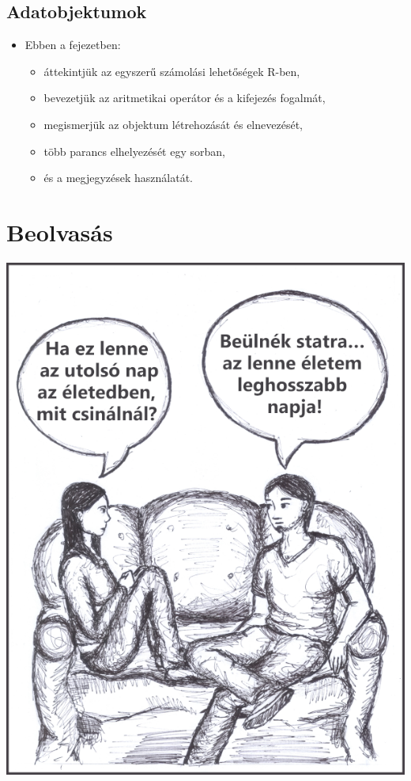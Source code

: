 \documentclass[
]{book}
\providecommand{\tightlist}{%
  \setlength{\itemsep}{0pt}\setlength{\parskip}{0pt}}
\newenvironment{rmdblock}[1]
  {\begin{shaded*}
  \begin{itemize}
  \renewcommand{\labelitemi}{
    \raisebox{-.7\height}[0pt][0pt]{
      {\setkeys{Gin}{width=3em,keepaspectratio}\texttt{[image: images/\#1]}}
    }
  }
  \item
  }
  {
  \end{itemize}
  \end{shaded*}
  }
\newenvironment{rmdlevel1}
  {\begin{rmdblock}{level1}}
  {\end{rmdblock}}
\begin{document}
\hypertarget{adatobjektumok}{%
\section{Adatobjektumok}\label{adatobjektumok}}

\begin{rmdlevel1}
Ebben a fejezetben:

\begin{itemize}
\tightlist
\item
  áttekintjük az egyszerű számolási lehetőségek R-ben,
\item
  bevezetjük az aritmetikai operátor és a kifejezés fogalmát,
\item
  megismerjük az objektum létrehozását és elnevezését,
\item
  több parancs elhelyezését egy sorban,
\item
  és a megjegyzések használatát.
\end{itemize}
\end{rmdlevel1}

\hypertarget{beolvasas}{%
\chapter{Beolvasás}\label{beolvasas}}

\begin{center}\includegraphics[width=0.7\linewidth]{images/ch_06_small} \end{center}
\end{document}
